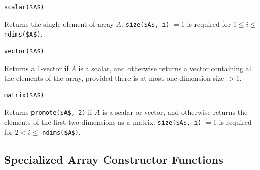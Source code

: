 \begin{operatordefinition}[scalar]
\begin{synopsis}\begin{lstlisting}
scalar($A$)
\end{lstlisting}\end{synopsis}
\begin{semantics}
Returns the single element of array $A$.
\lstinline!size($A$, i)! $= 1$ is required for $1 \leq i \leq$ \lstinline!ndims($A$)!.
\end{semantics}
\end{operatordefinition}

\begin{operatordefinition}[vector]
\begin{synopsis}\begin{lstlisting}
vector($A$)
\end{lstlisting}\end{synopsis}
\begin{semantics}
Returns a 1-vector if $A$ is a scalar, and otherwise returns a vector containing all the elements of the array, provided there is at most one dimension size $> 1$.
\end{semantics}
\end{operatordefinition}

\begin{operatordefinition}[matrix]
\begin{synopsis}\begin{lstlisting}
matrix($A$)
\end{lstlisting}\end{synopsis}
\begin{semantics}
Returns \lstinline!promote($A$, 2)! if $A$ is a scalar or vector, and otherwise returns the elements of the first two dimensions as a matrix.
\lstinline!size($A$, i)! $= 1$ is required for $2 < i \leq$ \lstinline!ndims($A$)!.
\end{semantics}
\end{operatordefinition}

\subsection{Specialized Array Constructor Functions}\label{specialized-array-constructor-functions}

